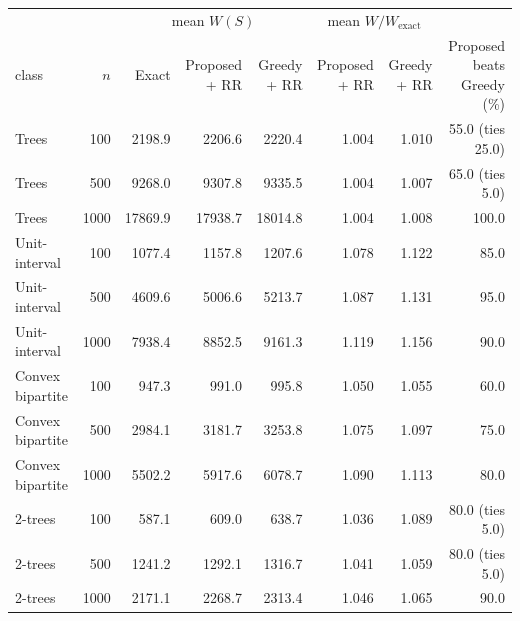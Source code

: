 \begin{tabular}{lr rrr rr r}
\toprule
 & & \multicolumn{3}{c}{mean $W(S)$} & \multicolumn{2}{c}{mean $W/W_{\mathrm{exact}}$} & \\
class & $n$ & Exact & Proposed + RR & Greedy + RR & Proposed + RR & Greedy + RR & Proposed beats Greedy (\%) \\
\midrule
Trees & 100 & 2198.9 & 2206.6 & 2220.4 & 1.004 & 1.010 & 55.0 (ties 25.0) \\
Trees & 500 & 9268.0 & 9307.8 & 9335.5 & 1.004 & 1.007 & 65.0 (ties 5.0) \\
Trees & 1000 & 17869.9 & 17938.7 & 18014.8 & 1.004 & 1.008 & 100.0 \\
\midrule
Unit-interval & 100 & 1077.4 & 1157.8 & 1207.6 & 1.078 & 1.122 & 85.0 \\
Unit-interval & 500 & 4609.6 & 5006.6 & 5213.7 & 1.087 & 1.131 & 95.0 \\
Unit-interval & 1000 & 7938.4 & 8852.5 & 9161.3 & 1.119 & 1.156 & 90.0 \\
\midrule
Convex bipartite & 100 & 947.3 & 991.0 & 995.8 & 1.050 & 1.055 & 60.0 \\
Convex bipartite & 500 & 2984.1 & 3181.7 & 3253.8 & 1.075 & 1.097 & 75.0 \\
Convex bipartite & 1000 & 5502.2 & 5917.6 & 6078.7 & 1.090 & 1.113 & 80.0 \\
\midrule
2-trees & 100 & 587.1 & 609.0 & 638.7 & 1.036 & 1.089 & 80.0 (ties 5.0) \\
2-trees & 500 & 1241.2 & 1292.1 & 1316.7 & 1.041 & 1.059 & 80.0 (ties 5.0) \\
2-trees & 1000 & 2171.1 & 2268.7 & 2313.4 & 1.046 & 1.065 & 90.0 \\
\bottomrule
\end{tabular}

